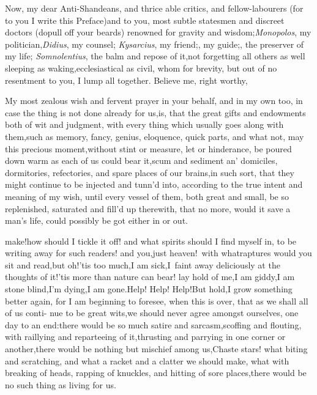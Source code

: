 \documentclass{article}
\begin{document}
Now, my dear Anti-Shandeans, and\break
thrice able critics, and
fellow-labourers (for to you I write this Preface)\tsh and
to you, most subtle statesmen and discreet doctors (do\tsk pull
off your beards) renowned for gravity and
wisdom;\tsh \textit{Monopolos}, my
politician,\tsk \textit{Didius}, my counsel; \textit{Kysarcius}, my
friend;\tsk {}, my
guide;\tsk {}, the preserv\-er of my life;
\textit{Somnolentius}, the balm and repose of it,\tsk not
forgetting all others as well sleeping as waking,\tsk ecclesiastical
as civil, whom for brevity, but out of no
resentment to you, I lump all together.\break
\tsh Believe me, right worthy,

My most zealous wish and fervent\break
prayer in your behalf, and in my own\break
too, in case the thing is not done already\break
for us,\tsh is, that the great gifts and endowments both of wit
and judgment, with every thing which usually goes al\-ong with
them,\tsh such as memory, fan\-cy, genius, eloquence, quick
parts, and what not, may this precious moment,\break without stint or
measure, let or hinderance, be poured down warm as each of us could
bear it,\tsk scum and sediment an’\break
{}
domiciles, dormitories, refectories, and spare places of our
brains,\tsh in such sort, that they might continue to be
injected and tunn’d into, according to the true intent
and meaning of my wish, until\break
every vessel of them, both great and\break
small, be so replenished, saturated and\break
fill’d up therewith, that no more, would it save a man’s life, could possibly be
got either in or out.

make!\tsh how should I tickle it off!\break
\tsh and what spirits should I find
myself in, to be writing away for such readers!\break
\tsk and you,\tsk just heaven!\tsk\  with what\break raptures would you
sit and read,\tsk but oh!\tsk ’tis too much,\tsh I
am sick,\tsh I~faint away deliciously at the thoughts of
it!\tsk ’tis more than nature can bear!\break
\tsk lay hold of
me,\tsh I am giddy,\tsk I am stone blind,\tsk I’m
dying,\tsk I am gone.\tsh Help! Help! Help!\tsh But
hold,\tsk I grow something better again, for I am beginning to
foresee, when this is over, that as we shall all of us conti-
nue to
be great wits,\tsk we should never agree amongst ourselves, one
day to an end:\tsh there would be so much satire and
sarcasm,\tsh scoffing and flouting, with raillying and
reparteeing of it,\tsk thrusting
and parrying in one corner or another,\tsh there would be
nothing but mischief among us,\tsk Chaste stars! what
biting and scratching, and what a racket and a clatter we should
make, what with breaking of heads, rapping of knuckles, and hitting
of sore places,\tsk there would be no such thing as living for
us.
\end{document}
